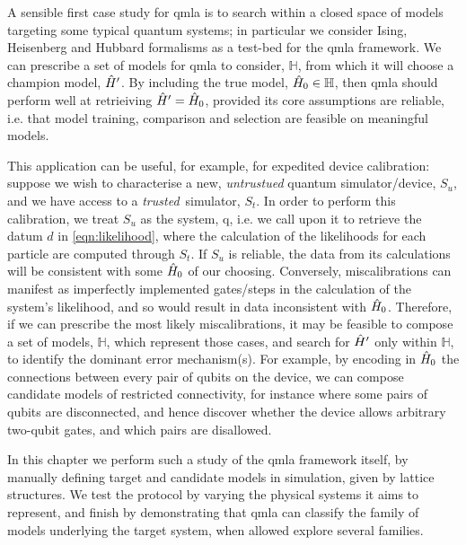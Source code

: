 
A sensible first case study for \gls{qmla} is to search within a closed space of models
    targeting some typical quantum systems; 
    in particular we consider Ising, Heisenberg and Hubbard formalisms as a test-bed for the \gls{qmla} framework. 
We can prescribe a set of models for \gls{qmla} to consider, $\mathbb{H}$,
    from which it will choose a \gls{champion model}, $\hat{H}^{\prime}$.
By including the \gls{true model}, $\hat{H}_0 \in \mathbb{H}$, 
    then \gls{qmla} should perform well at retrieiving $\hat{H}^{\prime}=\hat{H}_0$,
    provided its core assumptions are reliable, 
    i.e. that model training, comparison and selection are 
    feasible on meaningful models.
\par 

This application can be useful, for example, for expedited device calibration:
    suppose we wish to characterise a new, \emph{untrustued} quantum simulator/device, $S_u$, 
    and we have access to a \emph{trusted}\footnotemark \  simulator, $S_t$. 
In order to perform this calibration, 
    we treat $S_u$ as the system, \gls{q}, i.e. we call upon it to retrieve the datum $d$ in \cref{eqn:likelihood}, 
    where the calculation of the \glspl{likelihood}  for each \gls{particle} are computed through $S_t$. 
If $S_u$ is reliable, the data from its calculations will be consistent with some $\hat{H}_0$ of our choosing. 
Conversely, miscalibrations can manifest as imperfectly implemented gates/steps in the calculation of the system's \gls{likelihood}, 
    and so would result in data inconsistent with $\hat{H}_0$. 
Therefore, if we can prescribe the most likely miscalibrations, it may be feasible to compose a set 
    of models, $\mathbb{H}$, which represent those cases, and search for $\hat{H}^{\prime}$ only within $\mathbb{H}$,
    to identify the dominant error mechanism(s). 
For example, by encoding in $\hat{H}_0$ the connections between every pair of qubits on the device,
    we can compose candidate models of restricted connectivity, for instance where some pairs of qubits are disconnected, 
    and hence discover whether the device allows arbitrary two-qubit gates, 
    and which pairs are disallowed. 
\par

In this chapter we perform such a study of the \gls{qmla} framework itself, 
    by manually defining target and candidate models in simulation, 
    given by lattice structures.
We test the protocol by varying the physical systems it aims to represent, 
    and finish by demonstrating that \gls{qmla} can classify the family of models 
    underlying the target system, when allowed explore several families.  

